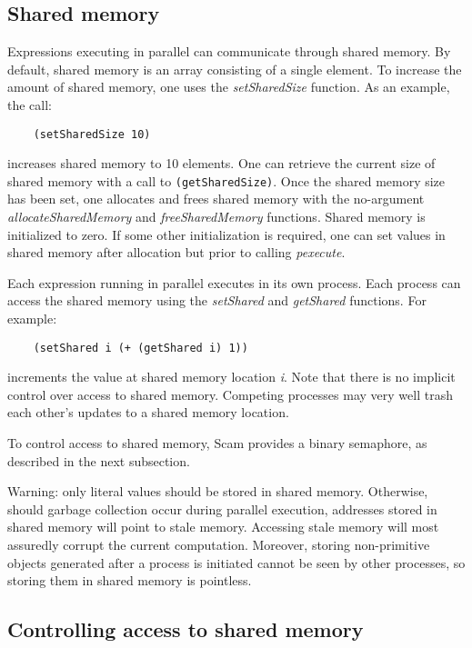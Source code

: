 \subsection{Shared memory}

Expressions executing in parallel can communicate through shared memory.
By default, shared memory is an array consisting of a single element.
To increase the amount of shared memory, one uses the {\it setSharedSize}
function.
As an example, the call:

\begin{verbatim}
    (setSharedSize 10)
\end{verbatim}

increases shared memory to 10 elements. One can retrieve the current size of
shared memory with a call to \verb!(getSharedSize)!.
Once the shared memory size has been set, one allocates and frees
shared memory with the no-argument {\it allocateSharedMemory}
and {\it freeSharedMemory}
functions.
Shared memory is initialized to zero. If some other initialization is
required, one can set values in shared memory after allocation but prior
to calling {\it pexecute}.

Each expression running in parallel executes in its own
process. Each process
can access the shared memory using the {\it setShared} and {\it getShared}
functions.  For example:

\begin{verbatim}
    (setShared i (+ (getShared i) 1))
\end{verbatim}

increments the value at shared memory location {\it i}. Note that there
is no implicit control over access to shared memory. Competing processes
may very well trash each other's updates to a shared memory location.

To control access to shared memory,
Scam provides a binary semaphore, as described
in the next subsection.

\color{red}
Warning:
\color{black}
only literal values should be stored in shared memory.
Otherwise, should garbage collection occur during parallel execution,
addresses stored in shared memory will point to stale memory.
Accessing stale memory
will most assuredly corrupt the current computation.
Moreover, storing non-primitive objects generated after a process 
is initiated cannot 
be seen by other processes, so storing them
in shared memory is pointless.

\subsection{Controlling access to shared memory}

